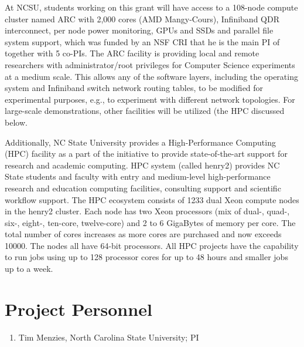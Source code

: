 \documentclass[twoside]{NSF}
\newenvironment{mynumns}
{ \begin{enumerate}[topsep=0pt,itemsep=0pt,leftmargin=*]
    \setlength{\itemsep}{0pt}
    \setlength{\parskip}{0pt}
    \setlength{\parsep}{0pt}     }
{ \end{enumerate}   }
\newcommand{\be}{\begin{mynumns}}
\newcommand{\ee}{\end{mynumns}}
\begin{document}
\begin{nsffacilities}
At NCSU, students working on this grant will have access to a 108-node compute cluster named ARC with 2,000 cores (AMD Mangy-Cours), Infiniband QDR interconnect, per node power monitoring, GPUs and SSDs and parallel file system support,
which was funded by an NSF CRI that he is the main PI of together with 5 co-PIs.  
The ARC facility is providing local and remote researchers with administrator/root privileges for Computer Science experiments at a
medium scale. This allows any of the software layers, including the operating system and Infiniband switch network routing tables, to be
modified for experimental purposes, e.g., to experiment with different
network topologies.  For large-scale demonstrations, other 
facilities will be utilized (the HPC discussed below.


Additionally, NC State University provides a High-Performance Computing (HPC) facility as a part of the initiative to provide state-of-the-art support for research and academic computing. HPC system (called henry2) provides NC State students and faculty with entry and medium-level high-performance research and education computing facilities, consulting support and scientific workflow support. The HPC ecosystem consists of 1233 dual Xeon compute nodes in the henry2 cluster. Each node has two Xeon processors (mix of dual-, quad-, six-, eight-, ten-core, twelve-core) and 2 to 6 GigaBytes of memory per core. The total number of cores increases as more cores are purchased and now exceeds 10000. The nodes all have 64-bit processors. All HPC projects have the capability to run jobs using up to 128 processor cores for up to 48 hours and smaller jobs up to a week.
 
 
  
  

\end{nsffacilities}

 
\newpage
\pagestyle{empty}
 
\section*{Project Personnel}
 
\be
\item Tim Menzies,
North Carolina State University; PI 
\ee
\end{document}
